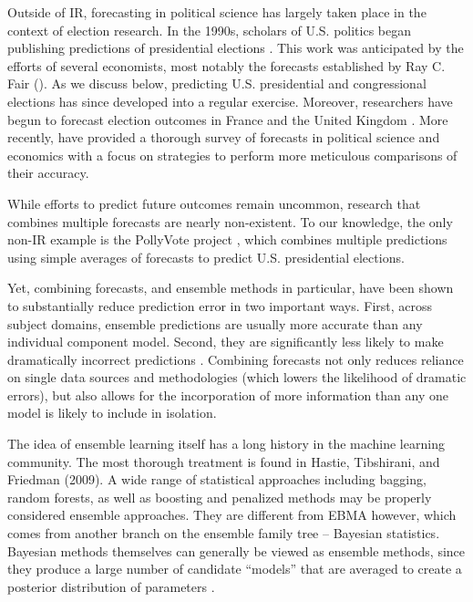 Outside of IR, forecasting in political science has largely taken
place in the context of election research.  In the 1990s, scholars of
U.S. politics began publishing predictions of presidential elections
\citep{Campbell:1990, Campbell:1992}. This work was anticipated by the
efforts of several economists, most notably the forecasts established
by Ray C. Fair (\citeyear{Fair:1978}). As we discuss below, predicting
U.S. presidential and congressional elections has since developed into
a regular exercise.  Moreover, researchers have begun to forecast
election outcomes in France \citep[e.g.,][]{Jerome:1999} and the
United Kingdom
\citep[e.g.,][]{Whitely:2005}.  More recently, \citet{brandt:freeman:schrodt:2011} have
provided a thorough survey of forecasts in political science and
economics with a focus on strategies to perform more meticulous
comparisons of their accuracy.

While efforts to predict future outcomes remain uncommon, research
that combines multiple forecasts are nearly non-existent.  To our
knowledge, the only non-IR example is the PollyVote project
\citep[c.f.][]{Graefe:2010}, which combines multiple predictions using
simple averages of forecasts to predict U.S. presidential elections.

Yet, combining forecasts, and ensemble methods in particular, have
been shown to substantially reduce prediction error in two important
ways.  First, across subject domains, ensemble predictions are usually
more accurate than any individual component model. Second, they are
significantly less likely to make dramatically incorrect predictions
\citep{Bates:1969, Armstrong:2001, Raftery:2005}.  Combining forecasts not only
reduces reliance on single data sources and methodologies (which
lowers the likelihood of dramatic errors), but also allows for the
incorporation of more information than any one model is likely to
include in isolation.

The idea of ensemble learning itself has a long history in the machine
learning community. The most thorough treatment is found in Hastie,
Tibshirani, and Friedman (2009).  A wide range of statistical
approaches including bagging, random forests, as well as boosting and
penalized methods may be properly considered ensemble approaches. They
are different from EBMA however, which comes from another branch on
the ensemble family tree -- Bayesian statistics.  Bayesian methods
themselves can generally be viewed as ensemble methods, since they
produce a large number of candidate ``models'' that are averaged to
create a posterior distribution of parameters
\citep[p. 605]{Hastie:2009}.

